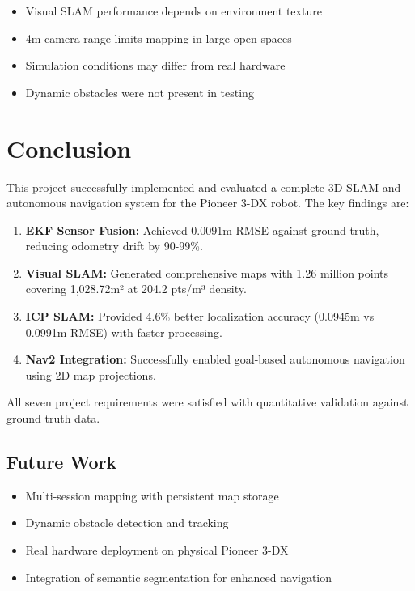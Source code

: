\documentclass[conference]{IEEEtran}
\begin{document}
\begin{itemize}
    \item Visual SLAM performance depends on environment texture
    \item 4m camera range limits mapping in large open spaces
    \item Simulation conditions may differ from real hardware
    \item Dynamic obstacles were not present in testing
\end{itemize}

\section{Conclusion}

This project successfully implemented and evaluated a complete 3D SLAM and autonomous navigation system for the Pioneer 3-DX robot. The key findings are:

\begin{enumerate}
    \item \textbf{EKF Sensor Fusion:} Achieved 0.0091m RMSE against ground truth, reducing odometry drift by 90-99\%.

    \item \textbf{Visual SLAM:} Generated comprehensive maps with 1.26 million points covering 1,028.72m² at 204.2 pts/m³ density.

    \item \textbf{ICP SLAM:} Provided 4.6\% better localization accuracy (0.0945m vs 0.0991m RMSE) with faster processing.

    \item \textbf{Nav2 Integration:} Successfully enabled goal-based autonomous navigation using 2D map projections.
\end{enumerate}

All seven project requirements were satisfied with quantitative validation against ground truth data.

\subsection{Future Work}

\begin{itemize}
    \item Multi-session mapping with persistent map storage
    \item Dynamic obstacle detection and tracking
    \item Real hardware deployment on physical Pioneer 3-DX
    \item Integration of semantic segmentation for enhanced navigation
\end{itemize}
\end{document}
